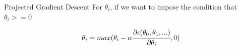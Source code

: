 \documentclass{beamer}
\begin{document}
	\begin{frame}{Projected Gradient Descent}
		For $\theta_{i}$, if we want to impose the condition that $\theta_{i}>=0$
		
		\begin{equation*}
		\theta_{i} = max(\theta_{i} - \alpha \cfrac{\partial \epsilon (\theta_{0},\theta_{1},...)}{ \partial \theta_{i}},0)
		\end{equation*}
	\end{frame}
	

	
	
\end{document}
